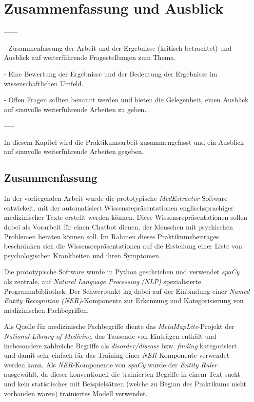 \chapter{Zusammenfassung und Ausblick}
\label{ch:zusammenfassung}


------

- Zusammenfassung der Arbeit und der Ergebnisse (kritisch betrachtet) und Ausblick auf weiterführende Fragestellungen zum Thema.


- Eine Bewertung der Ergebnisse und der Bedeutung der Ergebnisse im wissenschaftlichen Umfeld.


- Offen Fragen sollten benannt werden und bieten die Gelegenheit, einen Ausblick auf sinnvolle weiterführende Arbeiten zu geben.

-----

In diesem Kapitel wird die Praktikumsarbeit zusammengefasst und ein Ausblick auf sinnvolle weiterführende Arbeiten gegeben.




\section{Zusammenfassung}
\label{sec:Zusammenfassung} 

In der vorliegenden Arbeit wurde die prototypische \emph{MedExtractor}-Software entwickelt, mit der automatisiert Wissensrepräsentationen englischsprachiger medizinischer Texte erstellt werden können. Diese Wissensrepräsentationen sollen dabei als Vorarbeit für einen Chatbot dienen, der Menschen mit psychischen Problemen beraten können soll. Im Rahmen dieses Praktikumsbeitrages beschränken sich die Wissensrepräsentationen auf die Erstellung einer Liste von psychologischen Krankheiten und ihren Symptomen. 

Die prototypische Software wurde in Python geschrieben und verwendet \emph{spaCy} als zentrale, auf \emph{Natural Language Processing (NLP)} spezialisierte Programmbibliothek. Der Schwerpunkt lag dabei auf der Einbindung einer \emph{Named Entity Recognition (NER)}-Komponente zur Erkennung und Kategorisierung von medizinischen Fachbegriffen.

Als Quelle für medizinische Fachbegriffe diente das \emph{MetaMapLite}-Projekt der \emph{National Library of Medicine}, das Tausende von Einträgen enthält und insbesondere zahlreiche Begriffe als \emph{disorder/disease} bzw. \emph{finding} kategorisiert und damit sehr einfach für das Training einer \emph{NER}-Komponente verwendet werden kann. Als \emph{NER}-Komponente von \emph{spaCy} wurde der \emph{Entity Ruler} ausgewählt, da dieser konventionell die trainierten Begriffe in einem Text sucht und kein statistisches mit Beispielsätzen (welche zu Beginn des Praktikums nicht vorhanden waren) trainiertes Modell verwendet.

